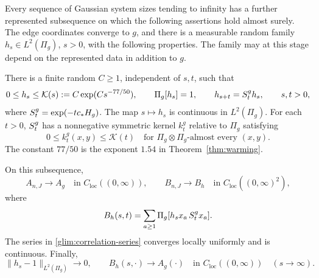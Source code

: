 \begin{proposition}
\label{prop:gaussian-subsequence}
Every sequence of Gaussian system sizes tending to infinity has a further represented
subsequence on which the following assertions hold almost surely.  The
edge coordinates converge to \(g\), and there is a measurable random
family \(h_s\in L^2(\Pi_g)\), \(s>0\), with the following properties.
The family may at this stage depend on the represented data in addition
to \(g\).

There is a finite random \(C\ge1\), independent of \(s,t\), such that
\begin{equation}
 0\le h_s\le \mathcal K(s):=C\exp(C s^{-77/50}),\qquad
 \Pi_g[h_s]=1,\qquad
 h_{s+t}=S^g_t h_s,\qquad s,t>0,
 \label{glim:density-family}
\end{equation}
where \(S^g_t=\exp(-t c_*H_g)\).  The map \(s\mapsto h_s\) is continuous
in \(L^2(\Pi_g)\).  For each \(t>0\), \(S^g_t\) has a nonnegative symmetric
kernel \(k_t^g\) relative to \(\Pi_g\) satisfying
\begin{equation}
 0\le k_t^g(x,y)\le \mathcal K(t)
 \quad\text{for \(\Pi_g\otimes\Pi_g\)-almost every \((x,y)\)}.
 \label{glim:limit-kernel}
\end{equation}
The constant \(77/50\) is the exponent \(1.54\) in
Theorem~\ref{thm:warming}.

On this subsequence,
\begin{equation}
 A_{n,J}\longrightarrow A_g
 \quad\text{in }C_{\mathrm{loc}}((0,\infty)),\qquad
 B_{n,J}\longrightarrow B_h
 \quad\text{in }C_{\mathrm{loc}}((0,\infty)^2),
 \label{glim:functional-subsequence}
\end{equation}
where
\begin{equation}
 B_h(s,t)=\sum_{a\ge1}\Pi_g[h_s x_a\,S^g_t x_a].
 \label{glim:correlation-series}
\end{equation}
The series in \eqref{glim:correlation-series} converges locally uniformly
and is continuous.  Finally,
\begin{equation}
 \|h_s-1\|_{L^2(\Pi_g)}\longrightarrow0,\qquad
 B_h(s,\cdot)\longrightarrow A_g(\cdot)
 \quad\text{in }C_{\mathrm{loc}}((0,\infty))
 \quad(s\to\infty).
 \label{glim:relaxation}
\end{equation}
\end{proposition}

